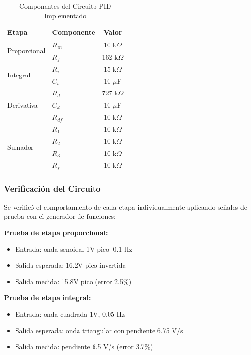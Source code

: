 \documentclass[conference]{IEEEtran}
\begin{document}
\begin{table}[htbp]
\centering
\caption{Componentes del Circuito PID Implementado}
\label{tab:componentes_pid}
\begin{tabular}{llc}
\toprule
\textbf{Etapa} & \textbf{Componente} & \textbf{Valor} \\
\midrule
\multirow{2}{*}{Proporcional} & $R_{in}$ & 10 k$\Omega$ \\
& $R_f$ & 162 k$\Omega$ \\
\midrule
\multirow{2}{*}{Integral} & $R_i$ & 15 k$\Omega$ \\
& $C_i$ & 10 $\mu$F \\
\midrule
\multirow{3}{*}{Derivativa} & $R_d$ & 727 k$\Omega$ \\
& $C_d$ & 10 $\mu$F \\
& $R_{df}$ & 10 k$\Omega$ \\
\midrule
\multirow{4}{*}{Sumador} & $R_1$ & 10 k$\Omega$ \\
& $R_2$ & 10 k$\Omega$ \\
& $R_3$ & 10 k$\Omega$ \\
& $R_s$ & 10 k$\Omega$ \\
\bottomrule
\end{tabular}
\end{table}

\subsubsection{Verificación del Circuito}

Se verificó el comportamiento de cada etapa individualmente aplicando señales de prueba con el generador de funciones:

\textbf{Prueba de etapa proporcional:}
\begin{itemize}
\item Entrada: onda senoidal 1V pico, 0.1 Hz
\item Salida esperada: 16.2V pico invertida
\item Salida medida: 15.8V pico (error 2.5\%)
\end{itemize}

\textbf{Prueba de etapa integral:}
\begin{itemize}
\item Entrada: onda cuadrada 1V, 0.05 Hz
\item Salida esperada: onda triangular con pendiente 6.75 V/s
\item Salida medida: pendiente 6.5 V/s (error 3.7\%)
\end{itemize}
\end{document}
